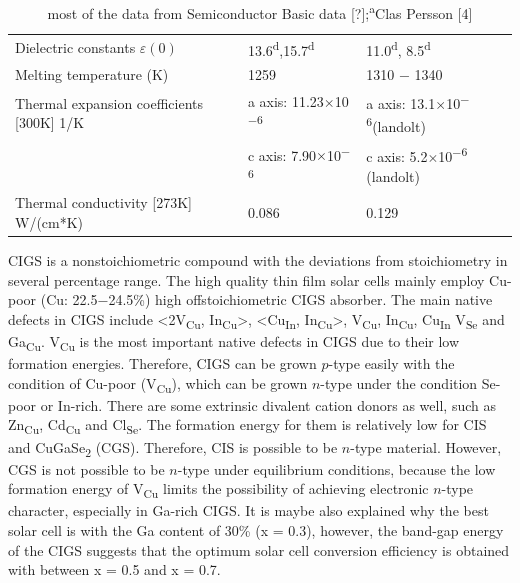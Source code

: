 \documentclass[a4paper, 12pt, titlepage,oneside,drop]{kthesis}
\begin{document}
\begin {table}[!htb]
\begin{tabular}{l l l}
Dielectric constants $\varepsilon(0)$ & 13.6\textsuperscript{d},15.7\textsuperscript{d} & 11.0\textsuperscript{d}, 8.5\textsuperscript{d}\\
\rowcolor[gray]{0.9}
Melting temperature (K)& 1259 & 1310 $-$ 1340\\
Thermal expansion coefficients [300K] 1/K & a axis: 11.23$\times$10\textsuperscript{$-$6}& a axis: 13.1$\times$10\textsuperscript{$-$6}(landolt)\\
& c axis: 7.90$\times$10\textsuperscript{$-$6}&c axis: 5.2$\times$10\textsuperscript{$-$6} (landolt)\\ 
\rowcolor[gray]{0.9}
Thermal conductivity [273K] W/(cm*K)& 0.086 & 0.129 \\ 
\bottomrule
\end{tabular}
\caption {most of the data from Semiconductor Basic data [?];\textsuperscript{a}Clas Persson [4]}
\label{kth518}
\end{table}




CIGS is a nonstoichiometric compound with the deviations from stoichiometry in several percentage range. The high quality thin film solar cells mainly employ Cu-poor (Cu: 22.5$-$24.5\%) high offstoichiometric CIGS absorber.
The main native defects in CIGS include <2V\textsubscript{Cu}, In\textsubscript{Cu}>, <Cu\textsubscript{In}, In\textsubscript{Cu}>, V\textsubscript{Cu}, In\textsubscript{Cu}, Cu\textsubscript{In} V\textsubscript{Se}
and Ga\textsubscript{Cu}. V\textsubscript{Cu} is the most important native defects in CIGS due to their low formation energies. Therefore, CIGS can be grown $p$-type easily with the condition of Cu-poor (V\textsubscript{Cu}),
which can be grown $n$-type under the condition Se-poor or In-rich. There are some extrinsic divalent cation donors as well, such as Zn\textsubscript{Cu}, Cd\textsubscript{Cu} and Cl\textsubscript{Se}. The formation energy 
for them is relatively low for CIS and CuGaSe\textsubscript{2} (CGS). Therefore, CIS is possible to be $n$-type material. However, CGS is not possible to be $n$-type under equilibrium conditions, because the low formation energy of
V\textsubscript{Cu} limits the possibility of achieving electronic $n$-type character, especially in Ga-rich CIGS. It is maybe also explained why the best solar cell is with the Ga content of 30\% (x = 0.3), however,
the band-gap energy of the CIGS suggests that the optimum solar cell conversion efficiency is obtained with between x = 0.5 and x = 0.7.
\end{document}
